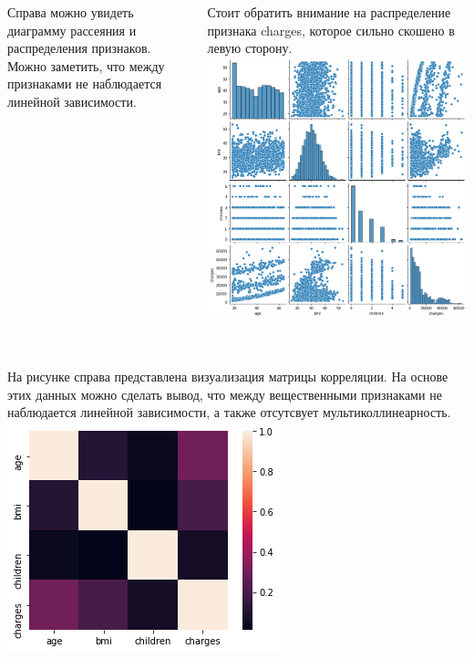 \documentclass[c]{beamer}  %
\begin{document}
	\begin{frame}
		\frametitle{\insertsection}

		\begin{columns}[onlytextwidth,T]
			\justifying
			Справа можно увидеть диаграмму рассеяния и распределения признаков. Можно заметить, что между
			признаками не наблюдается линейной зависимости.
			
			Стоит обратить внимание на распределение признака charges, которое сильно
			скошено в левую сторону.
			\includegraphics[scale=0.2]{scatterplot.png}
		\end{columns}
	\end{frame}

	\begin{frame}
		\frametitle{\insertsection}

		\begin{columns}[onlytextwidth,T]
			\column{0.7\textwidth}
			\justifying
			На рисунке справа представлена визуализация матрицы корреляции. На основе этих данных можно
			сделать вывод, что между вещественными признаками не наблюдается линейной зависимости, а также
			отсутсвует мультиколлинеарность.
			\column{0.3\textwidth}
			\includegraphics[scale=0.35]{correlation_matrix.png}
		\end{columns}
	\end{frame}
\end{document}

